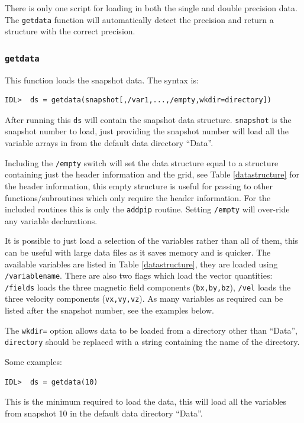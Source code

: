 \documentclass[11pt]{article}
\begin{document}
There is only one script for loading in both the single and double precision data. The \texttt{getdata} function will automatically detect the precision and return a structure with the correct precision.

\subsubsection{\texttt{getdata}}
This function loads the snapshot data. The syntax is:
\begin{verbatim}
IDL>  ds = getdata(snapshot[,/var1,...,/empty,wkdir=directory])
\end{verbatim}

After running this \texttt{ds} will contain the snapshot data structure. \texttt{snapshot} is the snapshot number to load, just providing the snapshot number will load all the variable arrays in from the default data directory ``Data''.

Including the \texttt{/empty} switch will set the data structure equal to a structure containing just the header information and the grid, see Table \ref{datastructure} for the header information, this empty structure is useful for passing to other functions/subroutines which only require the header information. For the included routines this is only the \texttt{addpip} routine. Setting \texttt{/empty} will over-ride any variable declarations.

It is possible to just load a selection of the variables rather than all of them, this can be useful with large data files as it saves memory and is quicker. The available variables are listed in Table \ref{datastructure}, they are loaded using \texttt{/variablename}. There are also two flags which load the vector quantities: \texttt{/fields} loads the three magnetic field components (\texttt{bx,by,bz}), \texttt{/vel} loads the three velocity components (\texttt{vx,vy,vz}). As many variables as required can be listed after the snapshot number, see the examples below.

The \texttt{wkdir=} option allows data to be loaded from a directory other than ``Data'', \texttt{directory} should be replaced with a string containing the name of the directory.

Some examples:
\begin{verbatim}
IDL>  ds = getdata(10)
\end{verbatim}
This is the minimum required to load the data, this will load all the variables from snapshot 10 in the default data directory ``Data''.
\end{document}
